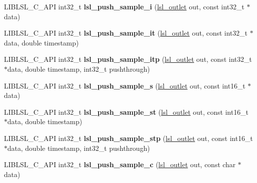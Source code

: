 \begin{DoxyCompactItemize}
\item 
\mbox{\label{namespacelsl_a5e6e682a09b4c90732e4fc631d643384}} 
L\+I\+B\+L\+S\+L\+\_\+\+C\+\_\+\+A\+PI int32\+\_\+t {\bfseries lsl\+\_\+push\+\_\+sample\+\_\+i} (\hyperlink{namespacelsl_abcf512b0f66dacf86c10b165995fd50b}{lsl\+\_\+outlet} out, const int32\+\_\+t $\ast$data)
\item 
\mbox{\label{namespacelsl_a87f61ecb0058ef8cd14a84693770b51d}} 
L\+I\+B\+L\+S\+L\+\_\+\+C\+\_\+\+A\+PI int32\+\_\+t {\bfseries lsl\+\_\+push\+\_\+sample\+\_\+it} (\hyperlink{namespacelsl_abcf512b0f66dacf86c10b165995fd50b}{lsl\+\_\+outlet} out, const int32\+\_\+t $\ast$data, double timestamp)
\item 
\mbox{\label{namespacelsl_aa0f3b0ccc233ebed00178e189c4678af}} 
L\+I\+B\+L\+S\+L\+\_\+\+C\+\_\+\+A\+PI int32\+\_\+t {\bfseries lsl\+\_\+push\+\_\+sample\+\_\+itp} (\hyperlink{namespacelsl_abcf512b0f66dacf86c10b165995fd50b}{lsl\+\_\+outlet} out, const int32\+\_\+t $\ast$data, double timestamp, int32\+\_\+t pushthrough)
\item 
\mbox{\label{namespacelsl_a8d80592d7fd643d64533ef83f6808743}} 
L\+I\+B\+L\+S\+L\+\_\+\+C\+\_\+\+A\+PI int32\+\_\+t {\bfseries lsl\+\_\+push\+\_\+sample\+\_\+s} (\hyperlink{namespacelsl_abcf512b0f66dacf86c10b165995fd50b}{lsl\+\_\+outlet} out, const int16\+\_\+t $\ast$data)
\item 
\mbox{\label{namespacelsl_a9a22e090bfa2e61ec19d70dc9bb5908d}} 
L\+I\+B\+L\+S\+L\+\_\+\+C\+\_\+\+A\+PI int32\+\_\+t {\bfseries lsl\+\_\+push\+\_\+sample\+\_\+st} (\hyperlink{namespacelsl_abcf512b0f66dacf86c10b165995fd50b}{lsl\+\_\+outlet} out, const int16\+\_\+t $\ast$data, double timestamp)
\item 
\mbox{\label{namespacelsl_a916ebe3afa6e7b83d670211c7320df51}} 
L\+I\+B\+L\+S\+L\+\_\+\+C\+\_\+\+A\+PI int32\+\_\+t {\bfseries lsl\+\_\+push\+\_\+sample\+\_\+stp} (\hyperlink{namespacelsl_abcf512b0f66dacf86c10b165995fd50b}{lsl\+\_\+outlet} out, const int16\+\_\+t $\ast$data, double timestamp, int32\+\_\+t pushthrough)
\item 
\mbox{\label{namespacelsl_aff896f8925d3453857deabc1f9cfd24a}} 
L\+I\+B\+L\+S\+L\+\_\+\+C\+\_\+\+A\+PI int32\+\_\+t {\bfseries lsl\+\_\+push\+\_\+sample\+\_\+c} (\hyperlink{namespacelsl_abcf512b0f66dacf86c10b165995fd50b}{lsl\+\_\+outlet} out, const char $\ast$data)

\end{DoxyCompactItemize}
